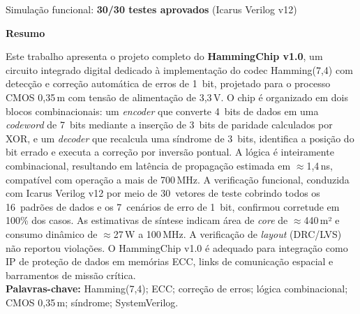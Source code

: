 \documentclass[12pt,a4paper]{article}
\begin{document}
\begin{center}

  \vfill
  {\small\textcolor{bwgray}{Simulação funcional: \textbf{30/30 testes aprovados} (Icarus Verilog v12)}}
\end{center}

\newpage

\begin{center}
  {\large\bfseries\color{bwblack} Resumo}
\end{center}
\begin{unidadebox}[Resumo]
Este trabalho apresenta o projeto completo do \textbf{HammingChip v1.0}, um circuito integrado digital dedicado à implementação do codec Hamming(7,4) com detecção e correção automática de erros de 1~bit, projetado para o processo CMOS 0,35\,\textmu m com tensão de alimentação de 3,3\,V. O chip é organizado em dois blocos combinacionais: um \textit{encoder} que converte 4~bits de dados em uma \textit{codeword} de 7~bits mediante a inserção de 3~bits de paridade calculados por XOR, e um \textit{decoder} que recalcula uma síndrome de 3~bits, identifica a posição do bit errado e executa a correção por inversão pontual. A lógica é inteiramente combinacional, resultando em latência de propagação estimada em $\approx$1,4\,ns, compatível com operação a mais de 700\,MHz. A verificação funcional, conduzida com Icarus Verilog v12 por meio de 30~vetores de teste cobrindo todos os 16~padrões de dados e os 7~cenários de erro de 1~bit, confirmou corretude em 100\% dos casos. As estimativas de síntese indicam área de \textit{core} de $\approx$440\,\textmu m² e consumo dinâmico de $\approx$27\,\textmu W a 100\,MHz. A verificação de \textit{layout} (DRC/LVS) não reportou violações. O HammingChip v1.0 é adequado para integração como IP de proteção de dados em memórias ECC, links de comunicação espacial e barramentos de missão crítica.\\[4pt]
\textbf{Palavras-chave:} Hamming(7,4); ECC; correção de erros; lógica combinacional; CMOS 0,35\,\textmu m; síndrome; SystemVerilog.
\end{unidadebox}
\end{document}
